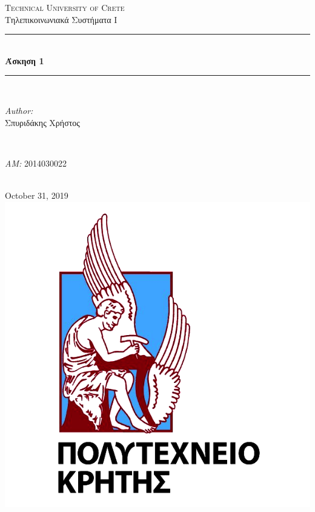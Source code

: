 \documentclass[11pt]{article}
\begin{document}
    \begin{titlepage}
        \center
        \textsc{\LARGE Technical University of Crete}\\[2cm] 
        \Large Τηλεπικοινωνιακά Συστήματα Ι\\[1cm] 
        
        \rule{\linewidth}{0.5mm} \\[0.5cm]
            { \huge \bfseries Άσκηση 1}\\[0.5cm]
        \rule{\linewidth}{0.5mm} \\[2.5cm]
        
        \begin{minipage}{0.4\textwidth}
            \begin{flushleft} \large
                \emph{Author:}\\
                    Σπυριδάκης Χρήστος
            \end{flushleft}
        \end{minipage}
        ~
        \begin{minipage}{0.4\textwidth}
            \begin{flushright} \large
                \emph{ΑΜ:} 2014030022
            \end{flushright}
        \end{minipage}\\[4cm]
        
        {\large October 31, 2019}\\[2cm] 
        \includegraphics[scale=0.5]{TUC.png} 
        \vfill
    \end{titlepage}
\end{document}
